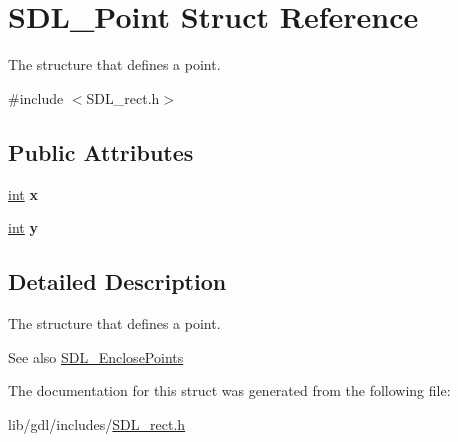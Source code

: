 \hypertarget{struct_s_d_l___point}{}\section{S\+D\+L\+\_\+\+Point Struct Reference}
\label{struct_s_d_l___point}


The structure that defines a point.  




{\ttfamily \#include $<$S\+D\+L\+\_\+rect.\+h$>$}

\subsection*{Public Attributes}
\begin{DoxyCompactItemize}
\item 
\hypertarget{struct_s_d_l___point_a2ee987d59888024771c8d83aec43056c}{}\hyperlink{_s_d_l__thread_8h_a6a64f9be4433e4de6e2f2f548cf3c08e}{int} {\bfseries x}\label{struct_s_d_l___point_a2ee987d59888024771c8d83aec43056c}

\item 
\hypertarget{struct_s_d_l___point_aaa68aefa869f6bdf46367a70bd9414b0}{}\hyperlink{_s_d_l__thread_8h_a6a64f9be4433e4de6e2f2f548cf3c08e}{int} {\bfseries y}\label{struct_s_d_l___point_aaa68aefa869f6bdf46367a70bd9414b0}

\end{DoxyCompactItemize}


\subsection{Detailed Description}
The structure that defines a point. 

\begin{DoxySeeAlso}{See also}
\hyperlink{_s_d_l__rect_8h_afcbb58dbba760b9e6fdb4b5d1ece015c}{S\+D\+L\+\_\+\+Enclose\+Points} 
\end{DoxySeeAlso}


The documentation for this struct was generated from the following file\+:\begin{DoxyCompactItemize}
\item 
lib/gdl/includes/\hyperlink{_s_d_l__rect_8h}{S\+D\+L\+\_\+rect.\+h}\end{DoxyCompactItemize}
